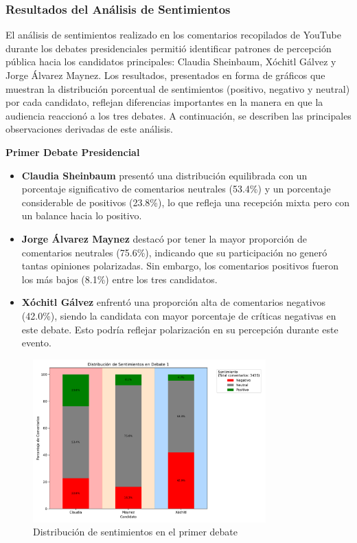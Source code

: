 \documentclass[10pt, a4paper]{article}
\begin{document}
	\subsubsection{Resultados del Análisis de Sentimientos}
	El análisis de sentimientos realizado en los comentarios recopilados de YouTube durante los debates presidenciales permitió identificar patrones de percepción pública hacia los candidatos principales: Claudia Sheinbaum, Xóchitl Gálvez y Jorge Álvarez Maynez. Los resultados, presentados en forma de gráficos que muestran la distribución porcentual de sentimientos (positivo, negativo y neutral) por cada candidato, reflejan diferencias importantes en la manera en que la audiencia reaccionó a los tres debates. A continuación, se describen las principales observaciones derivadas de este análisis.
	
	\textbf{Primer Debate Presidencial}
	\begin{itemize}
		\item \textbf{Claudia Sheinbaum} presentó una distribución equilibrada con un porcentaje significativo de comentarios neutrales (53.4\%) y un porcentaje considerable de positivos (23.8\%), lo que refleja una recepción mixta pero con un balance hacia lo positivo.
		\item \textbf{Jorge Álvarez Maynez} destacó por tener la mayor proporción de comentarios neutrales (75.6\%), indicando que su participación no generó tantas opiniones polarizadas. Sin embargo, los comentarios positivos fueron los más bajos (8.1\%) entre los tres candidatos.
		\item \textbf{Xóchitl Gálvez} enfrentó una proporción alta de comentarios negativos (42.0\%), siendo la candidata con mayor porcentaje de críticas negativas en este debate. Esto podría reflejar polarización en su percepción durante este evento.
	\end{itemize}
	\begin{figure}[H] %
		\centering
		\includegraphics[width=0.8\textwidth]{sA_debate1.pdf} %
		\caption{Distribución de sentimientos en el primer debate} %
		\label{fig:sA_debate1} %
	\end{figure}
	
\end{document}
